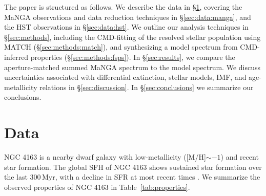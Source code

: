 \documentclass[preprint2]{aastex62}
\newcommand{\Myr}{$\,$Myr\xspace}
\begin{document}
The paper is structured as follows. We describe the data in \S\ref{sec:data}, covering the MaNGA observations and data reduction techniques in \S\ref{sec:data:manga}, and the HST observations in \S\ref{sec:data:hst}. We outline our analysis techniques in \S\ref{sec:methods}, including the CMD-fitting of the resolved stellar population using MATCH (\S\ref{sec:methods:match}), and synthesizing a model spectrum from CMD-inferred properties (\S\ref{sec:methods:fsps}). In \S\ref{sec:results}, we compare the aperture-matched summed MaNGA spectrum to the model spectrum. We discuss uncertainties associated with differential extinction, stellar models, IMF, and age-metallicity relations in \S\ref{sec:discussion}. In \S\ref{sec:conclusions} we summarize our conclusions.

\section{Data}\label{sec:data}

NGC 4163 is a nearby dwarf galaxy with low-metallicity ([M/H]$\sim -1$) and recent star formation\citep{ Kennicutt+2008, Lee+2009}. The global SFH of NGC 4163 shows sustained star formation over the last 300\Myr, with a decline in SFR at most recent times \citep{McQuinn+2010}. We summarize the observed properties of NGC 4163 in Table~\ref{tab:properties}.
\end{document}
